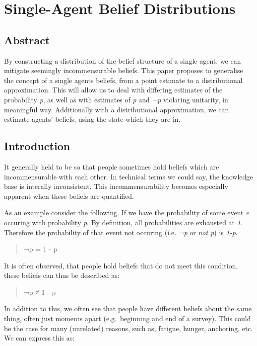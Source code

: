 \documentclass[a4paper]{book}\usepackage{graphicx, color}
\begin{document}
\chapter{Single-Agent Belief Distributions}

\section*{Abstract}
By constructing a distribution of the belief structure of a single
agent, we can mitigate seemingly incommensurable beliefs. This paper
proposes to generalise the concept of a single agents beliefs, from a
point estimate to a distributional approximation. This will allow us to
deal with differing estimates of the probability \emph{p}, as well as
with estimates of \emph{p} and \emph{¬p} violating unitarity, in
meaningful way. Additionally with a distributional approximation, we can
estimate agents' beliefs, using the state which they are in.

\section{Introduction}

It generally held to be so that people sometimes hold beliefs which are
incommensurable with each other. In technical terms we could say, the
knowledge base is interally inconsistent. This incommensurability
becomes especially apparent when these beliefs are quantified.

As an example consider the following. If we have the probability of some
event \emph{e} occuring with probability \emph{p}. By definition, all
probabilities are exhausted at \emph{1}. Therefore the probability of
that event not occuring (i.e. \emph{¬p} or \emph{not p}) is \emph{1-p}.

\begin{quote}
¬p = 1 - p
\end{quote}

It is often observed, that people hold beliefs that do not meet this
condition, these beliefs can thus be described as:

\begin{quote}
¬p ≠ 1 - p
\end{quote}

In addition to this, we often see that people have different beliefs
about the same thing, often just moments apart (e.g.~beginning and end
of a survey). This could be the case for many (unrelated) reasons, such
as, fatigue, hunger, anchoring, etc. We can express this as:
\end{document}
